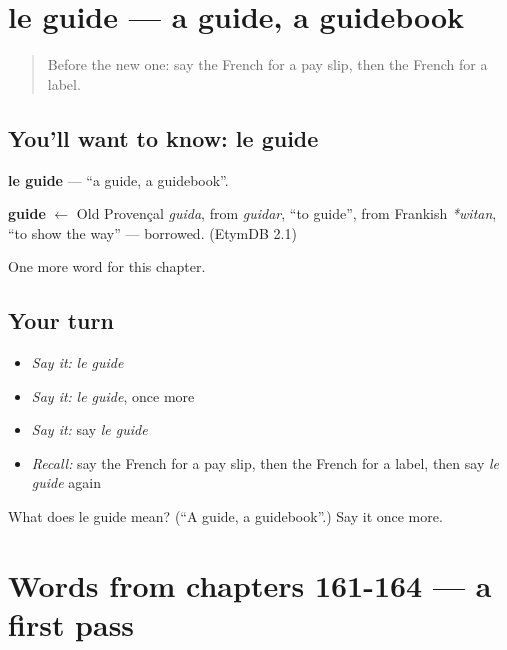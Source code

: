 \section[le guide]{le guide — a guide, a guidebook}

\label{lesson:FR-C169-guide}



\begin{quote}
Before the new one: say the French for a pay slip, then the French for a label.
\end{quote}

\subsection*{You'll want to know: le guide}
\textbf{le guide} — \textquotedblleft{}a guide, a guidebook\textquotedblright{}.

\begin{cousinweb}
\textbf{guide} $\leftarrow$ Old Provençal \emph{guida}, from \emph{guidar}, \textquotedblleft{}to guide\textquotedblright{}, from Frankish \emph{*witan}, \textquotedblleft{}to show the way\textquotedblright{} — borrowed. (EtymDB 2.1)
\end{cousinweb}

\begin{grammarlens}[title={What you've built}]
One more word for this chapter.
\end{grammarlens}

\subsection*{Your turn}
\begin{itemize}
\raggedright
  \item \emph{Say it:} \emph{le guide}
  \item \emph{Say it:} \emph{le guide}, once more
  \item \emph{Say it:} say \emph{le guide}
  \item \emph{Recall:} say the French for a pay slip, then the French for a label, then say \emph{le guide} again
\end{itemize}

\begin{tcolorbox}[breakable,colback=teal!4,colframe=teal!35!black,title={Before you move on}]
What does le guide mean? (\textquotedblleft{}A guide, a guidebook\textquotedblright{}.) Say it once more.
\end{tcolorbox}
\section[(dialogue)]{Words from chapters 161-164 — a first pass}

